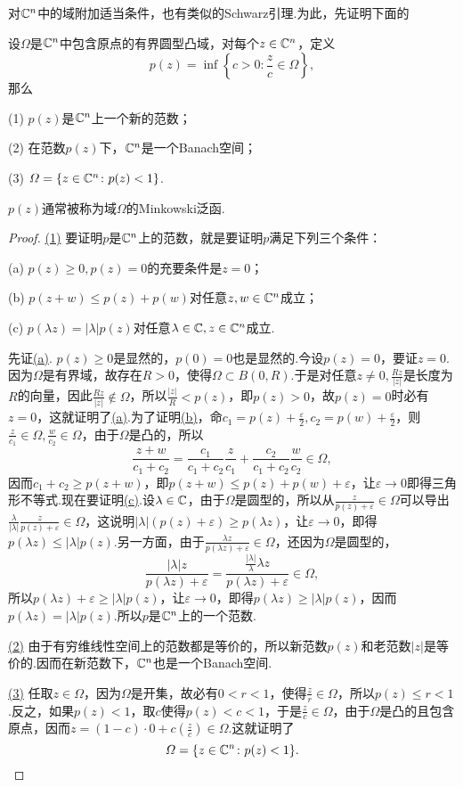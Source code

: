 对$\mathbb C^n$中的域附加适当条件，也有类似的Schwarz引理.为此，先证明下面的
\begin{prop}\label{prop2.4.1}
	设$\Omega$是$\mathbb C^n$中包含原点的有界圆型凸域，对每个$z\in\mathbb C^n$，定义
	\[p(z)=\inf\left\{c>0\colon\frac{z}{c}\in\Omega\right\},\]
	那么
	
	(1)\hypertarget{2.4.1}{}
	$p(z)$是$\mathbb C^n$上一个新的范数；
	
	(2)\hypertarget{2.4.1}{}
	在范数$p(z)$下，$\mathbb C^n$是一个Banach空间；
	
	(3)\hypertarget{2.4.1}{}
	$\varOmega=\{z\in\mathbb C^n\colon p(z)<1\}$.
	
	$p(z)$通常被称为域$\Omega$的Minkowski泛函.
\end{prop}
\begin{proof}
	\hyperlink{2.4.1}{(1)}
	要证明$p$是$\mathbb C^n$上的范数，就是要证明$p$满足下列三个条件：
	
	(a)\hypertarget{2.4.1.1}{}
	$p(z)\ge0,p(z)=0$的充要条件是$z=0$；
	
	(b)\hypertarget{2.4.1.1}{}
	$p(z+w)\le p(z)+p(w)$对任意$z,w\in\mathbb C^n$成立；
	
	(c)\hypertarget{2.4.1.1}{}
	$p(\lambda z)=|\lambda|p(z)$对任意$\lambda\in\mathbb C,z\in\mathbb C^n$成立.
	
    先证\hyperlink{2.4.1.1}{(a)}.
	$p(z)\ge0$是显然的，$p(0)=0$也是显然的.今设$p(z)=0$，要证$z=0$.因为$\Omega$是有界域，故存在$R>0$，使得$\Omega\subset B(0,R)$.于是对任意$z\neq0,\frac{Rz}{|z|}$是长度为$R$的向量，因此$\frac{Rz}{|z|}\notin\Omega$，所以$\frac{|z|}{R}<p(z)$，即$p(z)>0$，故$p(z)=0$时必有$z=0$，这就证明了\hyperlink{2.4.1.1}{(a)}.为了证明\hyperlink{2.4.1.1}{(b)}，命$c_1=p(z)+\frac{\varepsilon}{2},c_2=p(w)+\frac{\varepsilon}{2}$，则$\frac{z}{c_1}\in\Omega,\frac{w}{c_2}\in\Omega$，由于$\Omega$是凸的，所以
	\[\frac{z+w}{c_1+c_2}=\frac{c_1}{c_1+c_2}\frac{z}{c_1}+\frac{c_2}{c_1+c_2}\frac{w}{c_2}\in\Omega,\]
	因而$c_1+c_2\ge p(z+w)$，即$p(z+w)\le p(z)+p(w)+\varepsilon$，让$\varepsilon\to0$即得三角形不等式.现在要证明\hyperlink{2.4.1.1}{(c)}.设$\lambda\in\mathbb C$，由于$\Omega$是圆型的，所以从$\frac{z}{p(z)+\varepsilon}\in\Omega$可以导出$\frac{\lambda}{|\lambda|}\frac{z}{p(z)+\varepsilon}\in\Omega$，这说明$|\lambda|(p(z)+\varepsilon)\ge p(\lambda z)$，让$\varepsilon\to0$，即得$p(\lambda z)\le |\lambda|p(z)$.另一方面，由于$\frac{\lambda z}{p(\lambda z)+\varepsilon}\in\Omega$，还因为$\Omega$是圆型的，
	\[\frac{|\lambda|z}{p(\lambda z)+\varepsilon}=\frac{\frac{|\lambda|}{\lambda}\lambda z}{p(\lambda z)+\varepsilon}\in\Omega,\]
	所以$p(\lambda z)+\varepsilon\ge|\lambda|p(z)$，让$\varepsilon\to0$，即得$p(\lambda z)\ge|\lambda|p(z)$，因而$p(\lambda z)=|\lambda|p(z)$.所以$p$是$\mathbb C^n$上的一个范数.
	
	\hyperlink{2.4.1}{(2)}
	由于有穷维线性空间上的范数都是等价的，所以新范数$p(z)$和老范数$|z|$是等价的.因而在新范数下，$\mathbb C^n$也是一个Banach空间.
	
	\hyperlink{2.4.1}{(3)}
	任取$z\in\Omega$，因为$\Omega$是开集，故必有$0<r<1$，使得$\frac zr\in\Omega$，所以$p(z)\le r<1$.反之，如果$p(z)<1$，取$c$使得$p(z)<c<1$，于是$\frac zc\in\Omega$，由于$\Omega$是凸的且包含原点，因而$z=(1-c)\cdot 0+c\left(\frac zc\right)\in\Omega$.这就证明了
	\[\varOmega=\{z\in\mathbb C^n\colon p(z)<1\}.\qedhere\]
\end{proof}
